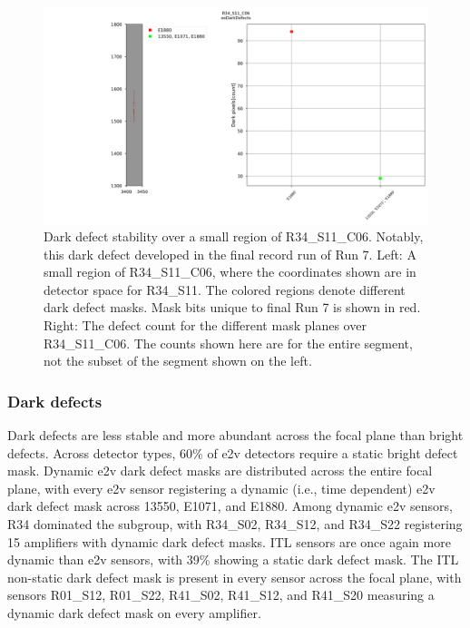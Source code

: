 \begin{figure}[ht]
    \centering
    \includegraphics[width=\linewidth]{figures/R34_S11_C06(2).jpg}
    \caption{Dark defect stability over a small region of R34\_S11\_C06. Notably, this dark defect developed in the final record run of Run 7. Left: A small region of R34\_S11\_C06, where the coordinates shown are in detector space for R34\_S11. The colored regions denote different dark defect masks. Mask bits unique to final Run 7 is shown in red. Right: The defect count for the different mask planes over R34\_S11\_C06. The counts shown here are for the entire segment, not the subset of the segment shown on the left.}
    \label{fig:DarkDefectStability}
\end{figure}

\subsubsection{Dark defects}

Dark defects are less stable and more abundant across the focal plane than bright defects. Across detector types, 60\% of e2v detectors require a static bright defect mask. Dynamic e2v dark defect masks are distributed across the entire focal plane, with every e2v sensor registering a dynamic (i.e., time dependent) e2v dark defect mask across 13550, E1071, and E1880. Among dynamic e2v sensors, R34 dominated the subgroup, with R34\_S02, R34\_S12, and R34\_S22 registering 15 amplifiers with dynamic dark defect masks. ITL sensors are once again more dynamic than e2v sensors, with 39\% showing a static dark defect mask. The ITL non-static dark defect mask is present in every sensor across the focal plane, with sensors R01\_S12, R01\_S22, R41\_S02, R41\_S12, and R41\_S20 measuring a dynamic dark defect mask on every amplifier.



